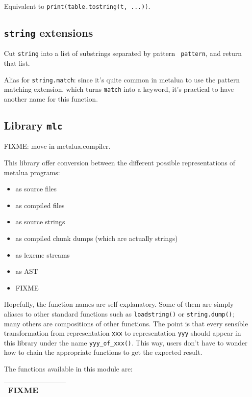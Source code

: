 
Equivalent to {\tt print(table.tostring(t, ...))}.

\subsection{{\tt string} extensions}

Cut {\tt string} into a list of substrings separated by pattern {\tt
  pattern}, and return that list.



Alias for {\tt string.match}: since it's quite common in metalua to
use the pattern matching extension, which turns {\tt match} into a
keyword, it's practical to have another name for this function.

\subsection{Library {\tt mlc}}

FIXME: move in metalua.compiler.

This library offer conversion between the different possible
representations of metalua programs:
\begin{itemize}
\item as source files
\item as compiled files
\item as source strings
\item as compiled chunk dumps (which are actually strings)
\item as lexeme streams
\item as AST
\item FIXME
\end{itemize}

Hopefully, the function names are self-explanatory. Some of them are
simply aliases to other standard functions such as {\tt loadstring()}
or {\tt string.dump()}; many others are compositions of other
functions. The point is that every sensible transformation from
representation {\tt xxx} to representation {\tt yyy} should appear in
this library under the name {\tt yyy\_of\_xxx()}. This way, users
don't have to wonder how to chain the appropriate functions to get the
expected result.

The functions available in this module are:

\begin{tabular}{|l|l|l|l|}
  \hline
  FIXME \\\hline
\end{tabular}

